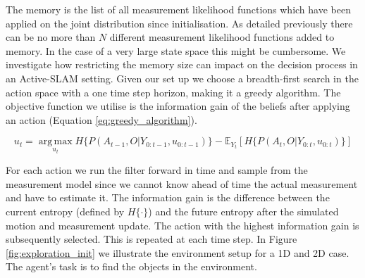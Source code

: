 The memory is the list of all measurement likelihood functions which have been applied on the joint 
distribution since initialisation. As detailed previously there can be no more than $N$ different measurement likelihood functions added to 
memory. In the case of a very large state space this might be cumbersome. We investigate how restricting the memory size 
can impact on the decision process in an Active-SLAM setting. Given our set up we choose a breadth-first search in the action 
space with a one time step horizon, making it a greedy algorithm. The objective function we utilise is the information
gain of the beliefs after applying an action (Equation \ref{eq:greedy_algorithm}).

\begin{equation}\label{eq:greedy_algorithm}
 u_{t} = \operatorname*{arg\,max}_{u_t} H\{P(A_{t-1},O|Y_{0:t-1},u_{0:t-1})\} - \mathbb{E}_{Y_t}\left[H\{P(A_{t},O|Y_{0:t},u_{0:t})\}\right]
\end{equation}

For each action we run the filter forward in time and sample from the measurement model since we cannot know ahead of time the actual 
measurement and have to estimate it. The information gain is the difference between the current entropy (defined 
by $H\{\cdot\}$) and the future entropy after the simulated motion and measurement update. The action with the highest information gain 
is subsequently selected. This is repeated at each time step. In Figure \ref{fig:exploration_init} we illustrate the environment setup for 
a 1D and 2D case. The agent's task is to find the objects in the environment.


